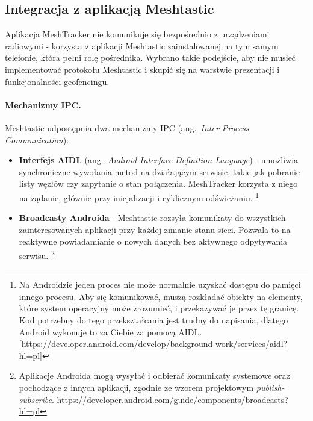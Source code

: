 \subsection*{Integracja z aplikacją Meshtastic}
\label{sec:integracja-meshtastic}

Aplikacja MeshTracker nie komunikuje się bezpośrednio z urządzeniami radiowymi - korzysta
z aplikacji Meshtastic zainstalowanej na tym samym telefonie, która pełni rolę pośrednika. 
Wybrano takie podejście, aby nie musieć implementować protokołu Meshtastic i skupić się na 
warstwie prezentacji i funkcjonalności geofencingu. 

\paragraph{Mechanizmy IPC.}

Meshtastic udpostępnia dwa mechanizmy IPC (ang.\ \textit{Inter-Process Communication}):

\begin{itemize}
    \item \textbf{Interfejs AIDL} (ang.\ \textit{Android Interface Definition Language}) -
          umożliwia synchroniczne wywołania metod na działającym serwisie, takie jak pobranie
          listy węzłów czy zapytanie o stan połączenia. MeshTracker korzysta z niego na żądanie,
          głównie przy inicjalizacji i cyklicznym odświeżaniu. \footnote{Na Androidzie jeden proces 
          nie może normalnie uzyskać dostępu do pamięci innego procesu. Aby się komunikować, muszą 
          rozkładać obiekty na elementy, które system operacyjny może zrozumieć, i przekazywać je 
          przez tę granicę. Kod potrzebny do tego przekształcania jest trudny do napisania, dlatego 
          Android wykonuje to za Ciebie za pomocą AIDL.[\url{https://developer.android.com/develop/background-work/services/aidl?hl=pl}]}

    \item \textbf{Broadcasty Androida} - Meshtastic rozsyła komunikaty do wszystkich
          zainteresowanych aplikacji przy każdej zmianie stanu sieci. Pozwala to na reaktywne
          powiadamianie o nowych danych bez aktywnego odpytywania serwisu.  
        \footnote{Aplikacje Androida mogą wysyłać i odbierać komunikaty systemowe oraz pochodzące z innych aplikacji, zgodnie ze wzorem projektowym \textit{publish-subscribe}. \url{https://developer.android.com/guide/components/broadcasts?hl=pl}}
\end{itemize}

